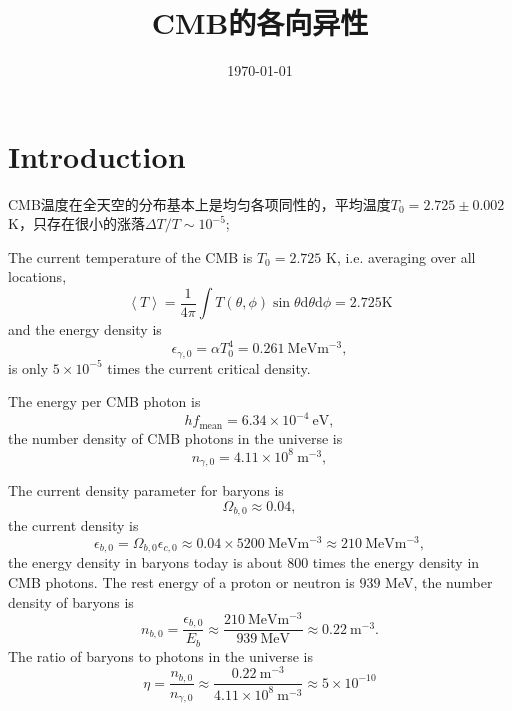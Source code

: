 \documentclass[12pt,a4paper]{article}
\title{CMB的各向异性}
\author{}
\date{\today}
\newcommand{\dif}{\mathrm{d}}
\begin{document}
\maketitle

\section{Introduction}
\cite{2010宇宙大尺度结构的形成, 2012宇宙大尺度结构的形成} CMB温度在全天空的分布基本上是均匀各项同性的，平均温度$T_0 = 2.725 \pm 0.002$ K，只存在很小的涨落$\Delta T/T \sim 10^{-5}$;

The current temperature of the CMB is $T_0 = 2.725$ K, i.e. averaging over all locations,
\begin{equation}
\left\langle T \right\rangle = \frac{1}{4\pi} \int T(\theta, \phi) \sin \theta \dif \theta \dif \phi = 2.725 \text{K}
\end{equation}
and the energy density is
\begin{equation}
\epsilon_{\gamma,0} = \alpha T_0^4 = 0.261 ~\text{MeV} \text{m}^{-3},
\end{equation}
is only $5\times 10^{-5}$ times the current critical density.

The energy per CMB photon is
\begin{equation}
hf_{\text{mean}} = 6.34\times 10^{-4} ~\text{eV},
\end{equation}
the number density of CMB photons in the universe is
\begin{equation}
n_{\gamma, 0} = 4.11\times 10^8 ~\text{m}^{-3},
\end{equation}

The current density parameter for baryons is
\begin{equation}
\Omega_{b,0} \approx 0.04,
\end{equation}
the current density is
\begin{equation}
\epsilon_{b, 0} = \Omega_{b,0} \epsilon_{c, 0} \approx 0.04 \times 5200 ~\text{MeV} \text{m}^{-3} \approx 210 ~\text{MeV} \text{m}^{-3},
\end{equation}
the energy density in baryons today is about $800$ times the energy density in CMB photons. The rest energy of a proton or neutron is $939$ MeV, the number density of baryons is
\begin{equation}
n_{b, 0} = \frac{\epsilon_{b,0}}{E_{b} } \approx \frac{210 ~\text{MeV} \text{m}^{-3} }{939 ~\text{MeV} } \approx 0.22 ~\text{m}^{-3} .
\end{equation}
The ratio of baryons to photons in the universe is
\begin{equation}
\eta = \frac{n_{b,0}}{n_{\gamma,0} } \approx \frac{0.22 ~\text{m}^{-3} }{ 4.11\times 10^8 ~\text{m}^{-3} } \approx 5\times 10^{-10}
\end{equation}
\end{document}
